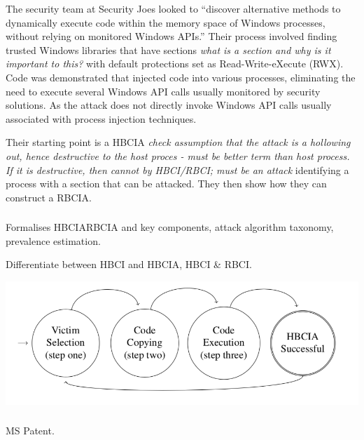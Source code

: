 \documentclass{article}
\begin{document}
The security team at Security Joes looked to ``discover alternative methods to dynamically execute code within
the memory space of Windows processes, without relying on monitored Windows APIs.''  Their process involved
finding trusted Windows libraries that have sections \textit{what is a section and why is it important to this?}
with default protections set as Read-Write-eXecute (RWX).  Code was demonstrated that injected code into various
processes, eliminating the need to execute several Windows API calls usually monitored by security solutions.
As the attack does not directly invoke Windows API calls usually associated with process injection techniques.

Their starting point is a HBCIA \textit{check assumption that the attack is a hollowing out, hence destructive to the host proces - must be better term than host process. If it is destructive, then cannot by HBCI/RBCI; must be an attack} identifying a process with a section that can be attacked.  They then show how they can construct a RBCIA.

\subsubsection{}
\textcite{Barabosch:2014}  Formalises HBCIA\/RBCIA and key components, attack algorithm taxonomy, prevalence estimation.

Differentiate between HBCI and HBCIA, HBCI \& RBCI.

\includegraphics[scale=0.4]{hbcia_3step_algo.png}

\subsubsection{}
\textcite{Ghizzoni:2004} MS Patent.


\subsubsection{}
\textcite{Jang:2007}
\end{document}
